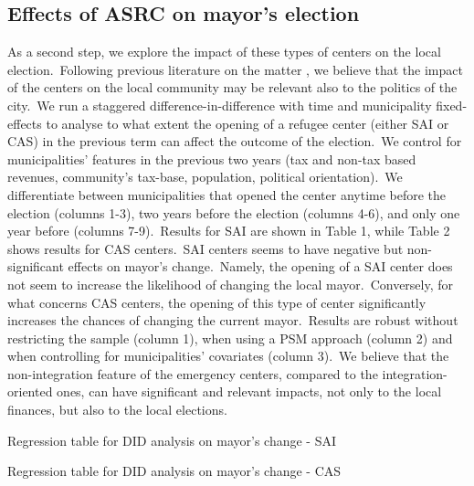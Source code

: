 \documentclass[authoryear,preprint,review,12pt]{elsarticle}
\renewcommand{\arraystretch}{1.2}
\begin{document}



\FloatBarrier

\subsection*{Effects of ASRC on mayor's election}
\normalsize

As a second step, we explore the impact of these types of centers on the local election.\ Following previous literature on the matter \citep{ambrosini2021}, we believe that the impact of the centers on the local community may be relevant also to the politics of the city.\ We run a staggered difference-in-difference with time and municipality fixed-effects to analyse to what extent the opening of a refugee center (either SAI or CAS) in the previous term can affect the outcome of the election.\ We control for municipalities' features in the previous two years (tax and non-tax based revenues, community's tax-base, population, political orientation).\ We differentiate between municipalities that opened the center anytime before the election (columns 1-3), two years before the election (columns 4-6), and only one year before (columns 7-9).\ Results for SAI are shown in Table 1, while Table 2 shows results for CAS centers.\ SAI centers seems to have negative but non-significant effects on mayor's change.\ Namely, the opening of a SAI center does not seem to increase the likelihood of changing the local mayor.\ Conversely, for what concerns CAS centers, the opening of this type of center significantly increases the chances of changing the current mayor.\ Results are robust without restricting the sample (column 1), when using a PSM approach (column 2) and when controlling for municipalities' covariates (column 3).\ We believe that the non-integration feature of the emergency centers, compared to the integration-oriented ones, can have significant and relevant impacts, not only to the local finances, but also to the local elections.\\  

\begin{table}[!ht]
\fontsize{2}{7.2}\selectfont
\renewcommand{\arraystretch}{1.5}
\caption{Regression table for DID analysis on mayor's change - SAI}
\centering

\end{table}

\begin{table}[!ht]
\fontsize{2}{7.2}\selectfont
\renewcommand{\arraystretch}{1.5}
\caption{Regression table for DID analysis on mayor's change - CAS}
\centering

\end{table}
\end{document}

